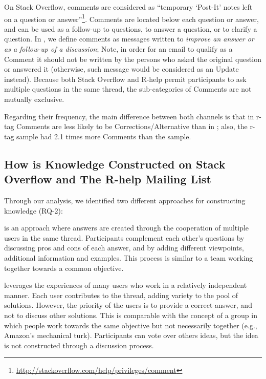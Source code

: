 On Stack Overflow, comments are considered as ``temporary `Post-It' notes left on a question or answer''\footnote{\url{http://stackoverflow.com/help/privileges/comment}}. Comments are located below each question or answer, and can be used as a follow-up to questions, to answer a question, or to clarify a question. In \RH, we define comments as messages written to \emph{improve an answer or as a follow-up of a discussion}; Note, in order for an email to qualify as a Comment it should not be written by the persons who asked the original question or answered it (otherwise, such message would be considered as an Update instead).
Because both Stack Overflow and R-help permit participants to ask multiple questions in the same thread, the sub-categories of Comments are not mutually exclusive.  

Regarding their frequency, the main difference between both channels is that in \SO r-tag Comments are less likely to be Corrections/Alternative than in \RH; also, the \SO r-tag sample had 2.1 times more Comments than the \RH sample.

\subsection{How is Knowledge Constructed on Stack Overflow and The R-help Mailing List}
\label{sec:rq2}

Through our analysis, we identified two different approaches for constructing knowledge (RQ-2):

\begin{description}[itemsep=2pt, topsep=0pt, leftmargin=1em, parsep=0pt]
\item[Participatory knowledge construction] is an approach where answers are created through the cooperation of multiple users in the same thread. Participants complement each other's questions by discussing pros and
  cons of each answer, and by adding different viewpoints, additional information and examples.
  This process is similar to a team working together towards
  a common objective.

\item[Crowd knowledge construction] leverages the experiences of many users who work in a relatively
  independent manner. Each user contributes to the thread, adding variety to the pool of solutions. However, the priority of the users is to provide a correct answer, and not to discuss other solutions.
  This is comparable with the concept of a group in which people work towards the same objective but not necessarily together (e.g., Amazon's mechanical turk). Participants can vote over others ideas, but the
  idea is not constructed through a discussion process.
\end{description}


